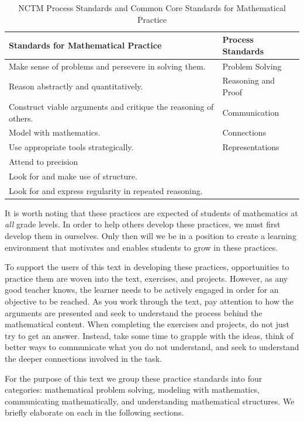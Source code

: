 \documentclass[
]{book}
\theoremstyle{definition}
\theoremstyle{definition}
\theoremstyle{definition}
\theoremstyle{definition}
\theoremstyle{remark}
\begin{document}
\begin{table}

\caption{\label{tab:SMPs}NCTM Process Standards and  Common Core Standards for Mathematical Practice}
\centering
\begin{tabular}[t]{l|l}
\hline
Standards for Mathematical Practice & Process Standards\\
\hline
Make sense of problems and persevere in solving them. & Problem Solving\\
\hline
Reason abstractly and quantitatively. & Reasoning and Proof\\
\hline
Construct viable arguments and critique the reasoning of others. & Communication\\
\hline
Model with mathematics. & Connections\\
\hline
Use appropriate tools strategically. & Representations\\
\hline
Attend to precision & \\
\hline
Look for and make use of structure. & \\
\hline
Look for and express regularity in repeated reasoning. & \\
\hline
\end{tabular}
\end{table}

It is worth noting that these practices are expected of students of mathematics at \emph{all} grade levels. In order to help others develop these practices, we must first develop them in ourselves. Only then will we be in a position to create a learning environment that motivates and enables students to grow in these practices.

To support the users of this text in developing these practices, opportunities to practice them are woven into the text, exercises, and projects. However, as any good teacher knows, the learner needs to be actively engaged in order for an objective to be reached. As you work through the text, pay attention to how the arguments are presented and seek to understand the process behind the mathematical content. When completing the exercises and projects, do not just try to get an answer. Instead, take some time to grapple with the ideas, think of better ways to communicate what you do not understand, and seek to understand the deeper connections involved in the task.

For the purpose of this text we group these practice standards into four categories: mathematical problem solving, modeling with mathematics, communicating mathematically, and understanding mathematical structures. We briefly elaborate on each in the following sections.
\end{document}
